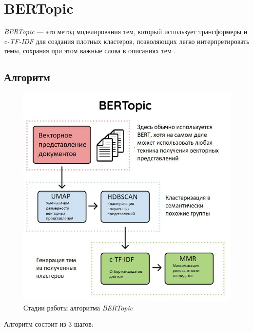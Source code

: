 \section{BERTopic}

\textit{BERTopic} --- это метод моделирования тем, который использует трансформеры и \textit{c-TF-IDF} для создания плотных кластеров, позволяющих легко интерпретировать темы, сохраняя при этом важные слова в описаниях тем \cite{bib234234}. 

\subsection{Алгоритм}

\begin{figure}[H]
\centering
\includegraphics[scale=0.7]{pics/bertopic.jpg}
\caption{Стадии работы алгоритма \textit{BERTopic}}
\end{figure}

Алгоритм состоит из 3 шагов:

